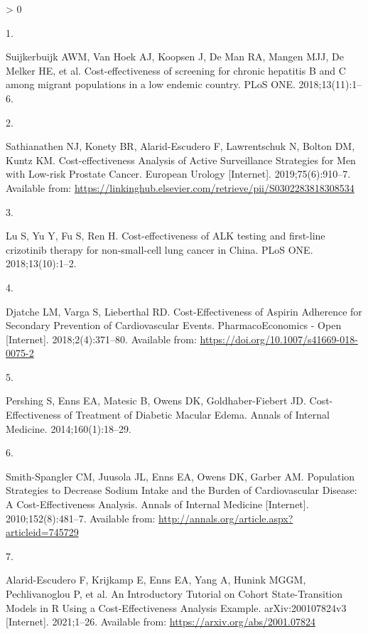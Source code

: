 \documentclass[
]{article}
\newlength{\cslhangindent}
\newlength{\csllabelwidth}
\newenvironment{CSLReferences}[2] %
 {%
  \setlength{\parindent}{0pt}
  \ifodd #1 \everypar{\setlength{\hangindent}{\cslhangindent}}\ignorespaces\fi
  \ifnum #2 > 0
  \setlength{\parskip}{#2\baselineskip}
  \fi
 }%
 {}
\newcommand{\CSLLeftMargin}[1]{\parbox[t]{\csllabelwidth}{#1}}
\newcommand{\CSLRightInline}[1]{\parbox[t]{\linewidth - \csllabelwidth}{#1}\break}
\begin{document}
\hypertarget{refs}{}
\begin{CSLReferences}{0}{0}
\leavevmode\hypertarget{ref-Suijkerbuijk2018}{}%
\CSLLeftMargin{1. }
\CSLRightInline{Suijkerbuijk AWM, Van Hoek AJ, Koopsen J, De Man RA, Mangen MJJ, De Melker HE, et al. {Cost-effectiveness of screening for chronic hepatitis B and C among migrant populations in a low endemic country}. PLoS ONE. 2018;13(11):1--6. }

\leavevmode\hypertarget{ref-Sathianathen2018a}{}%
\CSLLeftMargin{2. }
\CSLRightInline{Sathianathen NJ, Konety BR, Alarid-Escudero F, Lawrentschuk N, Bolton DM, Kuntz KM. {Cost-effectiveness Analysis of Active Surveillance Strategies for Men with Low-risk Prostate Cancer}. European Urology {[}Internet{]}. 2019;75(6):910--7. Available from: \url{https://linkinghub.elsevier.com/retrieve/pii/S0302283818308534}}

\leavevmode\hypertarget{ref-Lu2018b}{}%
\CSLLeftMargin{3. }
\CSLRightInline{Lu S, Yu Y, Fu S, Ren H. {Cost-effectiveness of ALK testing and first-line crizotinib therapy for non-small-cell lung cancer in China}. PLoS ONE. 2018;13(10):1--2. }

\leavevmode\hypertarget{ref-Djatche2018}{}%
\CSLLeftMargin{4. }
\CSLRightInline{Djatche LM, Varga S, Lieberthal RD. {Cost-Effectiveness of Aspirin Adherence for Secondary Prevention of Cardiovascular Events}. PharmacoEconomics - Open {[}Internet{]}. 2018;2(4):371--80. Available from: \url{https://doi.org/10.1007/s41669-018-0075-2}}

\leavevmode\hypertarget{ref-Pershing2014}{}%
\CSLLeftMargin{5. }
\CSLRightInline{Pershing S, Enns EA, Matesic B, Owens DK, Goldhaber-Fiebert JD. {Cost-Effectiveness of Treatment of Diabetic Macular Edema}. Annals of Internal Medicine. 2014;160(1):18--29. }

\leavevmode\hypertarget{ref-Smith-Spangler2010}{}%
\CSLLeftMargin{6. }
\CSLRightInline{Smith-Spangler CM, Juusola JL, Enns EA, Owens DK, Garber AM. {Population Strategies to Decrease Sodium Intake and the Burden of Cardiovascular Disease: A Cost-Effectiveness Analysis}. Annals of Internal Medicine {[}Internet{]}. 2010;152(8):481--7. Available from: \url{http://annals.org/article.aspx?articleid=745729}}

\leavevmode\hypertarget{ref-Alarid-Escudero2021a}{}%
\CSLLeftMargin{7. }
\CSLRightInline{Alarid-Escudero F, Krijkamp E, Enns EA, Yang A, Hunink MGGM, Pechlivanoglou P, et al. {An Introductory Tutorial on Cohort State-Transition Models in R Using a Cost-Effectiveness Analysis Example}. arXiv:200107824v3 {[}Internet{]}. 2021;1--26. Available from: \url{https://arxiv.org/abs/2001.07824}}


\end{CSLReferences}
\end{document}
